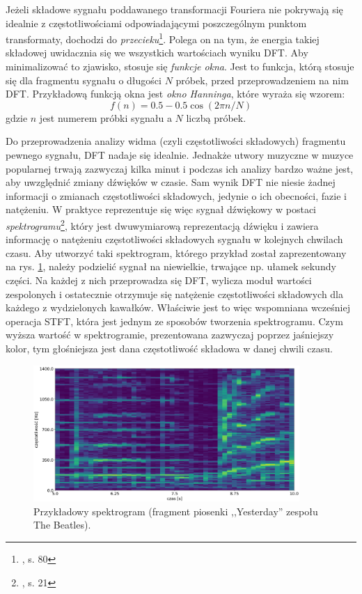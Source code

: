 Jeżeli składowe sygnału poddawanego transformacji Fouriera nie pokrywają się idealnie z częstotliwościami odpowiadającymi poszczególnym punktom transformaty, dochodzi do \emph{przecieku}\footnote{\cite{lyons_wprowadzenie_2000}, s. 80}. Polega on na tym, że energia takiej składowej uwidacznia się we wszystkich wartościach wyniku DFT. Aby minimalizować to zjawisko, stosuje się \emph{funkcje okna}. Jest to funkcja, którą stosuje się dla fragmentu sygnału o długości $N$ próbek, przed przeprowadzeniem na nim DFT. Przykładową funkcją okna jest \emph{okno Hanninga}, które wyraża się wzorem:
\begin{equation}
    f(n) = 0.5 - 0.5 \cos (2 \pi n / N)
\end{equation}
gdzie $n$ jest numerem próbki sygnału a $N$ liczbą próbek.

Do przeprowadzenia analizy widma (czyli częstotliwości składowych) fragmentu pewnego sygnału, DFT nadaje się idealnie. Jednakże utwory muzyczne w muzyce popularnej trwają zazwyczaj kilka minut i podczas ich analizy bardzo ważne jest, aby uwzględnić zmiany dźwięków w czasie. Sam wynik DFT nie niesie żadnej informacji o zmianach częstotliwości składowych, jedynie o ich obecności, fazie i natężeniu.  W praktyce reprezentuje się więc sygnał dźwiękowy w postaci \emph{spektrogramu}\footnote{\cite{lerch_introduction_2012}, s. 21}, który jest dwuwymiarową reprezentacją dźwięku i zawiera informację o natężeniu częstotliwości składowych sygnału w kolejnych chwilach czasu. Aby utworzyć taki spektrogram, którego przykład został zaprezentowany na rys.  \ref{fig:spektrogram}, należy podzielić sygnał na niewielkie, trwające np. ułamek sekundy części. Na każdej z nich przeprowadza się DFT, wylicza moduł wartości zespolonych i ostatecznie otrzymuje się natężenie częstotliwości składowych dla każdego z wydzielonych kawałków. Właściwie jest to więc wspomniana wcześniej operacja STFT, która jest jednym ze sposobów tworzenia spektrogramu. Czym wyższa wartość w spektrogramie, prezentowana zazwyczaj poprzez jaśniejszy kolor, tym głośniejsza jest dana częstotliwość składowa w danej chwili czasu.

\begin{figure}[htb]
    \centering
    \includegraphics[width=0.9\textwidth]{images/spektrogram}
    \caption{Przykładowy spektrogram (fragment piosenki ,,Yesterday'' zespołu The Beatles).}
    \label{fig:spektrogram}
\end{figure}



